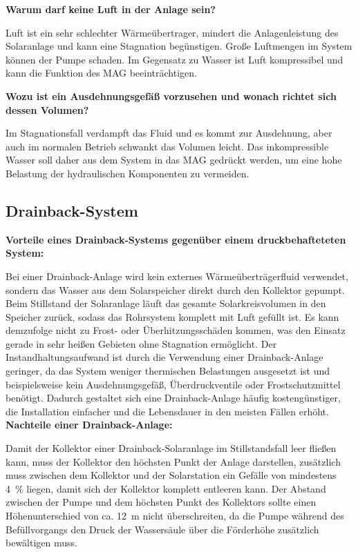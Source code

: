 \textbf{Warum darf keine Luft in der Anlage sein?}

Luft ist ein sehr schlechter Wärmeübertrager, mindert die Anlagenleistung des Solaranlage und kann eine Stagnation begünstigen. Große Luftmengen im System können der Pumpe schaden. Im Gegensatz zu Wasser ist Luft kompressibel und kann die Funktion des MAG beeinträchtigen.

\textbf{Wozu ist ein Ausdehnungsgefäß vorzusehen und wonach richtet sich dessen Volumen?}

Im Stagnationsfall verdampft das Fluid und es kommt zur Ausdehnung, aber auch im normalen Betrieb schwankt das Volumen leicht. Das inkompressible Wasser soll daher aus dem System in das MAG gedrückt werden, um eine hohe Belastung der hydraulischen Komponenten zu vermeiden. 

\subsection{Drainback-System}

\textbf{Vorteile eines Drainback-Systems gegenüber einem druckbehafteteten System:}

Bei einer Drainback-Anlage wird kein externes Wärmeüberträgerfluid verwendet, sondern das Wasser aus dem Solarspeicher direkt durch den Kollektor gepumpt. Beim Stillstand der Solaranlage läuft das gesamte Solarkreisvolumen in den Speicher zurück, sodass das Rohrsystem  komplett mit Luft gefüllt ist. Es kann demzufolge nicht zu Frost- oder Überhitzungsschäden kommen, was den Einsatz gerade in sehr heißen Gebieten ohne Stagnation ermöglicht. Der Instandhaltungsaufwand ist durch die Verwendung einer Drainback-Anlage geringer, da das System weniger thermischen Belastungen ausgesetzt ist und beispielsweise kein Ausdehnungsgefäß, Überdruckventile oder Frostschutzmittel benötigt. Dadurch gestaltet sich eine Drainback-Anlage häufig kostengünstiger, die Installation einfacher und die Lebensdauer in den meisten Fällen erhöht. \\

\textbf{Nachteile einer Drainback-Anlage:}

Damit der Kollektor einer Drainback-Solaranlage im Stillstandsfall leer fließen kann, muss der Kollektor den höchsten Punkt der Anlage darstellen, zusätzlich muss zwischen dem Kollektor und der Solarstation ein Gefälle von mindestens \SI{4}{\percent} liegen, damit sich der Kollektor komplett entleeren kann. 
Der Abstand zwischen der Pumpe und dem höchsten Punkt des Kollektors sollte einen Höhenunterschied von ca. \SI{12}{\meter} nicht überschreiten, da die Pumpe während des Befüllvorgangs den Druck der Wassersäule über die Förderhöhe zusätzlich bewältigen muss.

